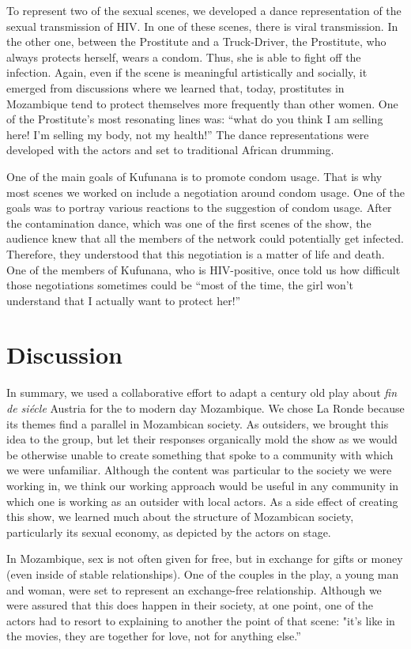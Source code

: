 \documentclass[article,twocolumn]{memoir}
\begin{document}
To represent two of the sexual scenes, we developed a dance representation of
the sexual transmission of HIV. In one of these scenes, there is viral
transmission. In the other one, between the Prostitute and a Truck-Driver, the
Prostitute, who always protects herself, wears a condom. Thus, she is able to
fight off the infection. Again, even if the scene is meaningful artistically and
socially, it emerged from discussions where we learned that, today, prostitutes
in Mozambique tend to protect themselves more frequently than other women. One
of the Prostitute's most resonating lines was: ``what do you think I am selling
here! I'm selling my body, not my health!'' The dance representations were
developed with the actors and set to traditional African drumming.

One of the main goals of Kufunana is to promote condom usage. That is why most
scenes we worked on include a negotiation around condom usage. One of the goals
was to portray various reactions to the suggestion of condom usage. After the
contamination dance, which was one of the first scenes of the show, the
audience knew that all the members of the network could potentially get
infected. Therefore, they understood that this negotiation is a matter of life
and death. One of the members of Kufunana, who is HIV-positive, once told us
how difficult those negotiations sometimes could be ``most of the time, the
girl won't understand that I actually want to protect her!''

\chapter{Discussion}

In summary, we used a collaborative effort to adapt a century old play about
\textit{fin de si\'{e}cle} Austria for the to modern day Mozambique. We chose
La Ronde because its themes find a parallel in Mozambican society.  As
outsiders, we brought this idea to the group, but let their responses
organically mold the show as we would be otherwise unable to create something
that spoke to a community with which we were unfamiliar. Although the content
was particular to the society we were working in, we think our working approach
would be useful in any community in which one is working as an outsider with
local actors. As a side effect of creating this show, we learned much about the
structure of Mozambican society, particularly its sexual economy, as depicted
by the actors on stage.

In Mozambique, sex is not often given for free, but in exchange for gifts or
money (even inside of stable relationships). One of the couples in the play, a
young man and woman, were set to represent an exchange-free relationship.
Although we were assured that this does happen in their society, at one point,
one of the actors had to resort to explaining to another the point of that
scene: "it's like in the movies, they are together for love, not for anything
else.''
\end{document}
